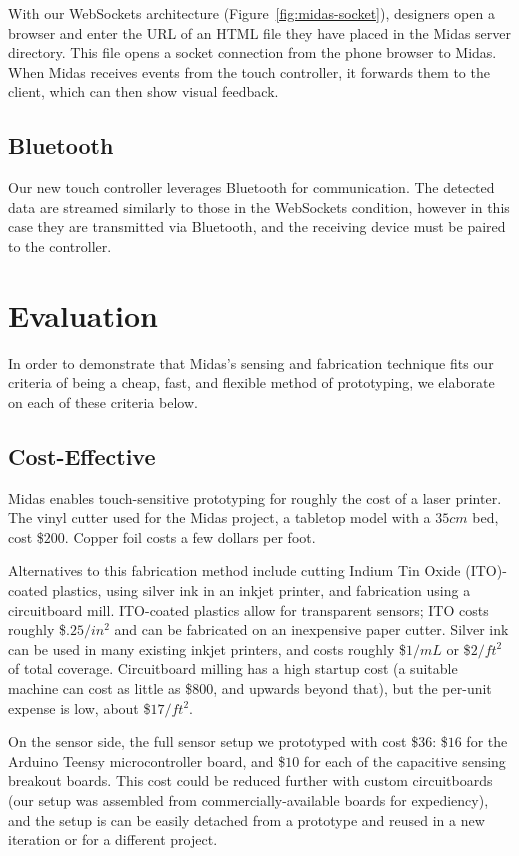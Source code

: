 With our WebSockets architecture (Figure~\ref{fig:midas-socket}), designers open a browser and enter the URL of an HTML file they have placed in the Midas server directory. This file opens a socket connection from the phone browser to Midas. When Midas receives events from the touch controller, it forwards them to the client, which can then show visual feedback.

\subsection{Bluetooth}

Our new touch controller leverages Bluetooth for communication. The detected data are streamed similarly to those in the WebSockets condition, however in this case they are transmitted via Bluetooth, and the receiving device must be paired to the controller.

\section{Evaluation}

    In order to demonstrate that Midas's sensing and fabrication technique fits our criteria of being a cheap, fast, and flexible method of prototyping, we elaborate on each of these criteria below.

    \subsection{Cost-Effective}
    
    Midas enables touch-sensitive prototyping for roughly the cost of a laser printer. The vinyl cutter used for the Midas project, a tabletop model with a $35cm$ bed, cost \$$200$. Copper foil costs a few dollars per foot.
    
    Alternatives to this fabrication method include cutting Indium Tin Oxide (ITO)-coated plastics, using silver ink in an inkjet printer, and fabrication using a circuitboard mill. ITO-coated plastics allow for transparent sensors; ITO costs roughly \$$.25/in^2$ and can be fabricated on an inexpensive paper cutter. Silver ink can be used in many existing inkjet printers, and costs roughly \$$1/mL$ or \$$2/ft^2$ of total coverage. Circuitboard milling has a high startup cost (a suitable machine can cost as little as \$$800$, and upwards beyond that), but the per-unit expense is low, about \$$17/ft^2$.
    
    On the sensor side, the full sensor setup we prototyped with cost \$$36$: \$$16$ for the Arduino Teensy microcontroller board, and \$$10$ for each of the capacitive sensing breakout boards. This cost could be reduced further with custom circuitboards (our setup was assembled from commercially-available boards for expediency), and the setup is can be easily detached from a prototype and reused in a new iteration or for a different project.
    
